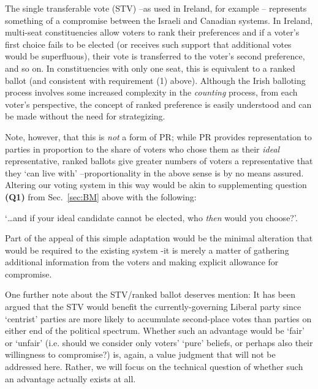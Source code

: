 \documentclass[DIV=calc, paper=a4, fontsize=11pt, twocolumn]{scrartcl}	 %
\begin{document}
The single transferable vote (STV) \---as used in Ireland, for example\cite{Irish_howto_vote_doc}
\--- represents something of a compromise between the Israeli and Canadian systems. In Ireland, multi-seat constituencies allow voters to  rank their preferences and if a voter's first choice fails to be elected (or receives such support that additional votes would be superfluous), their vote is transferred to the voter's second preference, and so on. In constituencies with only one seat, this is equivalent to a ranked ballot (and consistent with requirement (1) above). 
Although the Irish balloting process involves some increased complexity in the \emph{counting} process, from each voter's perspective, the concept of ranked preference is easily understood and can be made without the need for strategizing.

Note, however, that this is \emph{not} a form of PR; while PR provides representation to parties in proportion to the share of voters who chose them as their \emph{ideal} representative, ranked ballots give greater numbers of voters a representative that they `can live with' \---proportionality in the above sense is by no means assured.
Altering our voting system in this way would be akin to supplementing question \textbf{(Q1)} from Sec.~\ref{sec:BM} above with the following: 

\begin{tcolorbox}[colback=white!5!white,colframe=blue!55!black]
`\ldots and if your ideal candidate cannot be elected, who \emph{then} would you choose?'. 
\end{tcolorbox}

Part of the appeal of this simple adaptation would be the minimal alteration that would be required to the existing system \--it is merely a matter of gathering additional information from the voters and making explicit allowance for compromise.

One further note about the STV/ranked ballot deserves mention: It has been argued\cite{Record}
 that the STV would benefit the currently-governing Liberal party since  `centrist' parties are more likely to accumulate second-place votes than parties on either end of the political spectrum. 
Whether such an advantage would be `fair' or `unfair' (i.e. should we consider only voters' `pure' beliefs, or perhaps also their willingness to compromise?) is, again, a value judgment that will not be addressed here. Rather, we will focus on the technical question of whether such an advantage actually exists at all.
\end{document}
